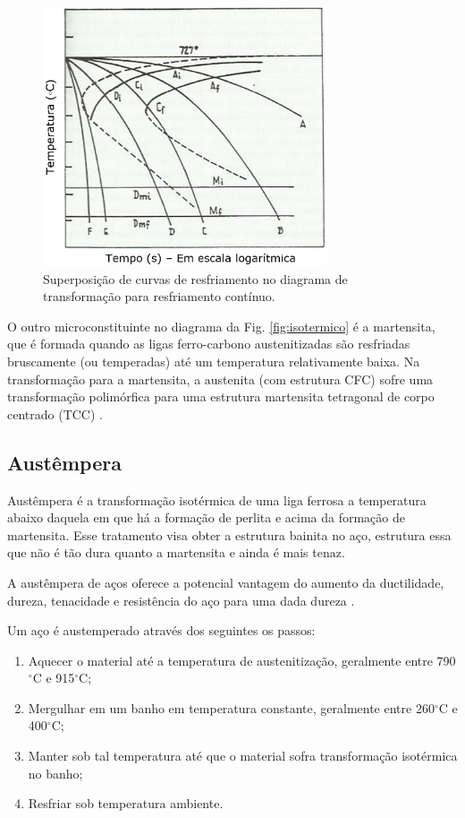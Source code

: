 \documentclass[
12pt,
openany, %
oneside, %
a4paper,			
english,			
brazil			        %
]{abntbibufjf}
\begin{document}
	\begin{figure}[H]
		\centering
		\includegraphics[width=0.75\textwidth]{resfriamento_ttt}
		\caption{Superposição de curvas de resfriamento no diagrama de transformação para resfriamento contínuo. \cite{chiaverini2003tratamentos}}
		\label{fig:resfriamento_ttt}
	\end{figure}

	O outro microconstituinte no diagrama da Fig. \ref{fig:isotermico} é a martensita, que é formada quando as ligas ferro-carbono austenitizadas são resfriadas bruscamente (ou temperadas) até um temperatura relativamente baixa. Na transformação para a martensita, a austenita (com estrutura CFC) sofre uma transformação polimórfica para uma estrutura martensita tetragonal de corpo centrado (TCC) \cite{callister2011materials}.




\subsection{Austêmpera}
	Austêmpera é a transformação isotérmica de uma liga ferrosa a temperatura abaixo daquela em que há a formação de perlita e acima da formação de martensita. Esse tratamento visa obter a estrutura bainita no aço, estrutura essa que não é tão dura quanto a martensita e ainda é mais tenaz.
	
	A austêmpera de aços oferece a potencial vantagem do aumento da ductilidade, dureza, tenacidade e resistência do aço para uma dada dureza \cite{asm1991heat}.
	
	Um aço é austemperado através dos seguintes os passos:
	
	\begin{enumerate}
		\item Aquecer o material até a temperatura de austenitização, geralmente entre 790$^{\circ}$C e 915$^{\circ}$C;
		\item Mergulhar em um banho em temperatura constante, geralmente entre 260$^{\circ}$C e 400$^{\circ}$C;
		\item Manter sob tal temperatura até que o material sofra transformação isotérmica no banho;
		\item Resfriar sob temperatura ambiente.
	\end{enumerate}
\end{document}
